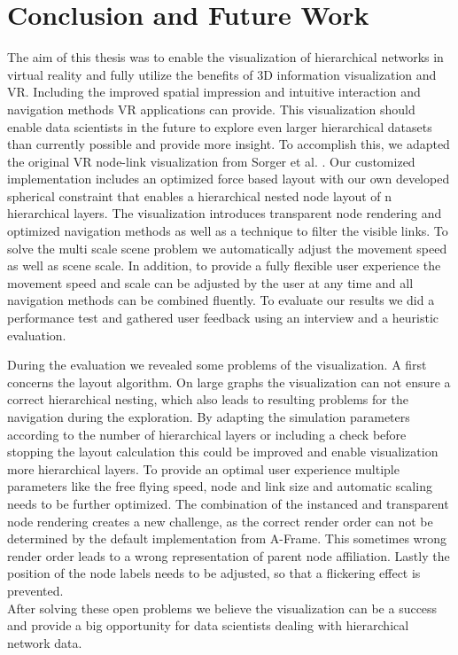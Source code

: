 \chapter{Conclusion and Future Work}
\label{chap:conclusion}

The aim of this thesis was to enable the visualization of hierarchical networks in virtual reality and fully utilize the benefits of 3D information visualization and VR. 
Including the improved spatial impression and intuitive interaction and navigation methods VR applications can provide. 
This visualization should enable data scientists in the future to explore even larger hierarchical datasets than currently possible and provide more insight.
To accomplish this, we adapted the original VR node-link visualization from Sorger et al. \cite{sorger_immersive_2019}. 
Our customized implementation includes an optimized force based layout with our own developed spherical constraint that enables a hierarchical nested node layout of n hierarchical layers.
The visualization introduces transparent node rendering and optimized navigation methods as well as a technique to filter the visible links. 
To solve the multi scale scene problem we automatically adjust the movement speed as well as scene scale.
In addition, to provide a fully flexible user experience the movement speed and scale can be adjusted by the user at any time and all navigation methods can be combined fluently.
To evaluate our results we did a performance test and gathered user feedback using an interview and a heuristic evaluation.

During the evaluation we revealed some problems of the visualization. 
A first concerns the layout algorithm. On large graphs the visualization can not ensure a correct hierarchical nesting, which also leads to resulting problems for the navigation during the exploration. By adapting the simulation parameters according to the number of hierarchical layers or including a check before stopping the layout calculation this could be improved and enable visualization more hierarchical layers.
To provide an optimal user experience multiple parameters like the free flying speed, node and link size and automatic scaling needs to be further optimized.
The combination of the instanced and transparent node rendering creates a new challenge, as the correct render order can not be determined by the default implementation from A-Frame. This sometimes wrong render order leads to a wrong representation of parent node affiliation.
Lastly the position of the node labels needs to be adjusted, so that a flickering effect is prevented.
\\
After solving these open problems we believe the visualization can be a success and provide a big opportunity for data scientists dealing with hierarchical network data.

